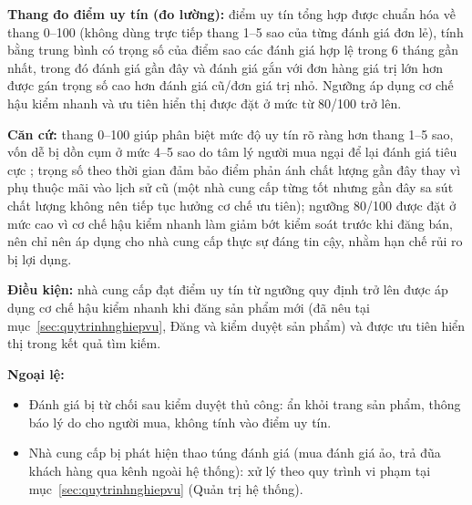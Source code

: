 \noindent\textbf{Thang đo điểm uy tín (đo lường):} điểm uy tín tổng hợp được chuẩn hóa về thang 0--100 (không dùng trực tiếp thang 1--5 sao của từng đánh giá đơn lẻ), tính bằng trung bình có trọng số của điểm sao các đánh giá hợp lệ trong 6 tháng gần nhất, trong đó đánh giá gần đây và đánh giá gắn với đơn hàng giá trị lớn hơn được gán trọng số cao hơn đánh giá cũ/đơn giá trị nhỏ. Ngưỡng áp dụng cơ chế hậu kiểm nhanh và ưu tiên hiển thị được đặt ở mức từ 80/100 trở lên.

\noindent\textbf{Căn cứ:} thang 0--100 giúp phân biệt mức độ uy tín rõ ràng hơn thang 1--5 sao, vốn dễ bị dồn cụm ở mức 4--5 sao do tâm lý người mua ngại để lại đánh giá tiêu cực \parencite{springer_article}; trọng số theo thời gian đảm bảo điểm phản ánh chất lượng gần đây thay vì phụ thuộc mãi vào lịch sử cũ (một nhà cung cấp từng tốt nhưng gần đây sa sút chất lượng không nên tiếp tục hưởng cơ chế ưu tiên); ngưỡng 80/100 được đặt ở mức cao vì cơ chế hậu kiểm nhanh làm giảm bớt kiểm soát trước khi đăng bán, nên chỉ nên áp dụng cho nhà cung cấp thực sự đáng tin cậy, nhằm hạn chế rủi ro bị lợi dụng.

\noindent\textbf{Điều kiện:} nhà cung cấp đạt điểm uy tín từ ngưỡng quy định trở lên được áp dụng cơ chế hậu kiểm nhanh khi đăng sản phẩm mới (đã nêu tại mục~\ref{sec:quytrinhnghiepvu}, Đăng và kiểm duyệt sản phẩm) và được ưu tiên hiển thị trong kết quả tìm kiếm.

\noindent\textbf{Ngoại lệ:}
\begin{itemize}
    \item Đánh giá bị từ chối sau kiểm duyệt thủ công: ẩn khỏi trang sản phẩm, thông báo lý do cho người mua, không tính vào điểm uy tín.
    \item Nhà cung cấp bị phát hiện thao túng đánh giá (mua đánh giá ảo, trả đũa khách hàng qua kênh ngoài hệ thống): xử lý theo quy trình vi phạm tại mục~\ref{sec:quytrinhnghiepvu} (Quản trị hệ thống).
\end{itemize}

